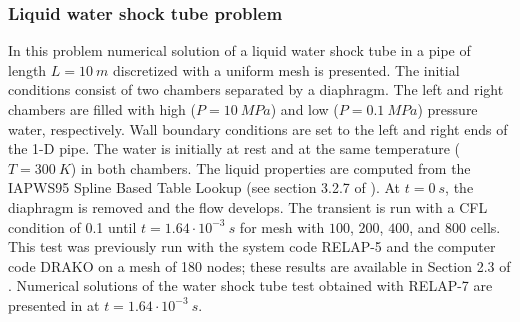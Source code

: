 \documentclass{inputs/mc2015}
\begin{document}
\subsubsection{Liquid water shock tube problem} \label{sec:liq-water-1-phase-shock-tube}
%
In this problem numerical solution of a liquid water shock tube in a pipe of length $L = 10 \ m$ discretized with a uniform mesh is presented. The initial conditions consist of two chambers separated by a diaphragm. The left and right chambers are filled with high ($P=10\ MPa$) and low ($P=0.1\ MPa$) pressure water, respectively. Wall boundary conditions are set to the left and right ends of the 1-D pipe. The water is initially at rest and at the same temperature ($T=300\ K$) in both chambers. The liquid properties are computed from the IAPWS95 Spline Based Table Lookup (see section 3.2.7 of \cite{relap7-manual}). At $t=0\ s$, the diaphragm is removed and the flow develops. The transient is run with a CFL condition of 0.1 until $t=1.64 \cdot 10^{-3} \ s$ for mesh with $100$, $200$, $400$, and $800$ cells. This test was previously run with the system code RELAP-5 and the computer code DRAKO \cite{drako} on a mesh of 180 nodes; these results are available in Section 2.3 of \cite{Sokolowski-Koszela}. Numerical solutions of the water shock tube test obtained with RELAP-7 are presented in  at $t=1.64 \cdot 10^{-3} \ s$.
%
\end{document}

